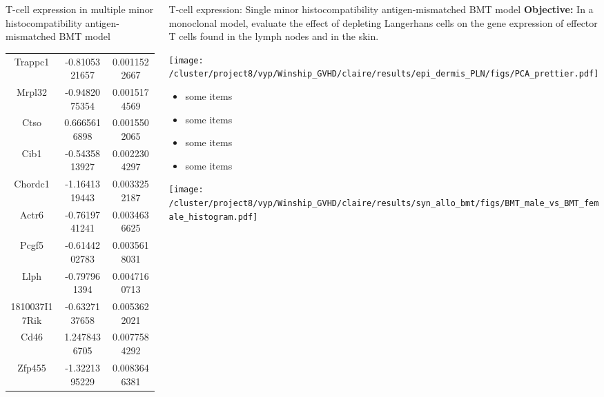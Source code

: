 \documentclass[final,hyperref={pdfpagelabels=false}]{beamer}
\begin{document}
\begin{frame}{}
\begin{columns}[t]
\begin{column}{.24\linewidth}
\begin{block}{T-cell expression in multiple minor histocompatibility antigen-mismatched BMT model}
\begin{center}
{\begin{tabular}{ |c|c|c| }
	      Trappc1 & -0.8105321657 & 0.0011522667 \\
	      Mrpl32 & -0.9482075354 & 0.0015174569 \\
	      Ctso & 0.6665616898 & 0.0015502065 \\
	      Cib1 & -0.5435813927 & 0.0022304297 \\
	      Chordc1  & -1.1641319443 & 0.0033252187 \\
	      Actr6 & -0.7619741241 & 0.0034636625 \\
	      Pcgf5 & -0.6144202783 & 0.0035618031 \\
	      Llph & -0.797961394 & 0.0047160713 \\
	      1810037I17Rik & -0.6327137658 & 0.0053622021 \\
	      Cd46 & 1.2478436705 & 0.0077584292 \\
	      Zfp455 & -1.3221395229 & 0.0083646381 \\
	      \hline
	    \end{tabular} }
	  \end{center}
        \end{block}
      \end{column}
      \begin{column}{.25\linewidth}
        \begin{block}{T-cell expression: Single minor histocompatibility antigen-mismatched BMT model}
	  {\bf Objective:} In a monoclonal model, evaluate the effect of depleting Langerhans cells on the gene expression of effector T cells found in the lymph nodes and in the skin.
	  \begin{center}
	   \texttt{[image: /cluster/project8/vyp/Winship\_GVHD/claire/results/epi\_dermis\_PLN/figs/PCA\_prettier.pdf]}
            \end{center}
{\small          \begin{itemize}
          \item some items
          \item some items
          \item some items
          \item some items
          \end{itemize}}
	  \begin{minipage}{0.45\textwidth}
            \texttt{[image: /cluster/project8/vyp/Winship\_GVHD/claire/results/syn\_allo\_bmt/figs/BMT\_male\_vs\_BMT\_female\_histogram.pdf]}
          \end{minipage}
          \begin{minipage}{0.45\textwidth}

\end{minipage}
\end{block}
\end{column}
\end{columns}
\end{frame}
\end{document}
